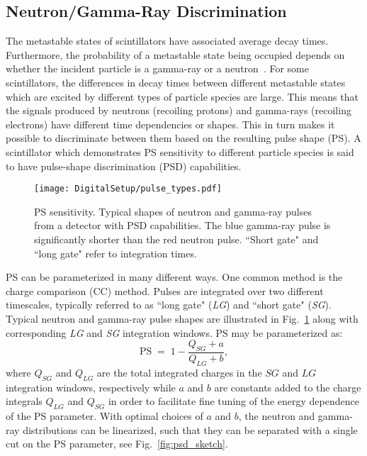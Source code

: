 \documentclass[main.tex]{subfiles}
\begin{document}
\subsection{Neutron/Gamma-Ray Discrimination}\label{sec:psd}
The metastable states of scintillators have associated average decay times. 
Furthermore, the probability of a metastable state being occupied depends on whether the incident particle is a gamma-ray or a neutron~\cite{Krane}. For some scintillators, the differences in decay times between different metastable states which are excited by different types of particle species are large. This means that the signals produced by neutrons (recoiling protons) and gamma-rays (recoiling electrons) have different time dependencies or shapes. This in turn makes it possible to discriminate between them based on the resulting pulse shape (PS). A scintillator which demonstrates PS sensitivity to different particle species is said to have pulse-shape discrimination (PSD) capabilities.
\begin{figure}[ht]
	\centering
    	\texttt{[image: DigitalSetup/pulse\_types.pdf]}
        \caption[PS sensitivity.]{PS sensitivity. Typical shapes of neutron and gamma-ray pulses from a detector with PSD capabilities. The blue gamma-ray pulse is significantly shorter than the red neutron pulse. ``Short gate" and ``long gate" refer to integration times.}
	    \label{fig:pulse_types} 
\end{figure}

PS can be parameterized in many different ways. One common method is the charge comparison (CC) method. Pulses are integrated over two different timescales, typically referred to as ``long gate" (\textit{LG}) and ``short gate" (\textit{SG}). Typical neutron and gamma-ray pulse shapes are illustrated in Fig.~\ref{fig:pulse_types} along with corresponding \textit{LG} and \textit{SG} integration windows. PS may be parameterized as:
\begin{equation}
	\textrm{PS} \; = \; 1-\frac{Q_{SG} + a}{Q_{LG} + b},
	\label{eq:ps}
\end{equation}
where $Q_{SG}$ and $Q_{LG}$ are the total integrated charges in the $SG$ and $LG$ integration windows, respectively while $a$ and $b$ are constants added to the charge integrals $Q_{LG}$ and $Q_{SG}$ in order to facilitate fine tuning of the energy dependence of the PS parameter. 
With optimal choices of $a$ and $b$, the neutron and gamma-ray distributions can be linearized, such that they can be separated with a single cut on the PS parameter, see Fig.~\ref{fig:psd_sketch}.
\end{document}
